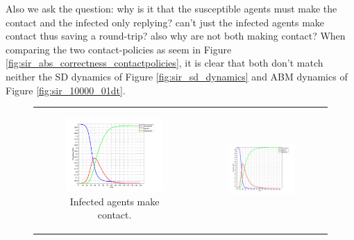 Also we ask the question: why is it that the susceptible agents must make the contact and the infected only replying? can't just the infected agents make contact thus saving a round-trip? also why are not both making contact? When comparing the two contact-policies as seem in Figure \ref{fig:sir_abs_correctness_contactpolicies}, it is clear that both don't match neither the SD dynamics of Figure \ref{fig:sir_sd_dynamics} and ABM dynamics of Figure \ref{fig:sir_10000_01dt}.

\begin{figure}
\begin{center}

	\begin{tabular}{c c}
		\begin{subfigure}[b]{0.5\textwidth}
			\centering
			\includegraphics[width=1\textwidth, angle=0]{./../shared/fig/frabs/INFECTED_CONTACT_ONLY_SIR_10000agents_150t_01dt_parallel.png}
			\caption{Infected agents make contact.}
			\label{fig:sir_abs_correctness_contact_infected}
		\end{subfigure}
    	&
		\begin{subfigure}[b]{0.5\textwidth}
			\centering
			\includegraphics[width=1\textwidth, angle=0]{./../shared/fig/frabs/INFECTED_AND_SUSCEPTIBLE_CONTACT_SIR_10000agents_150t_01dt_parallel.png}

\end{subfigure}
\end{tabular}
\end{center}
\end{figure}
